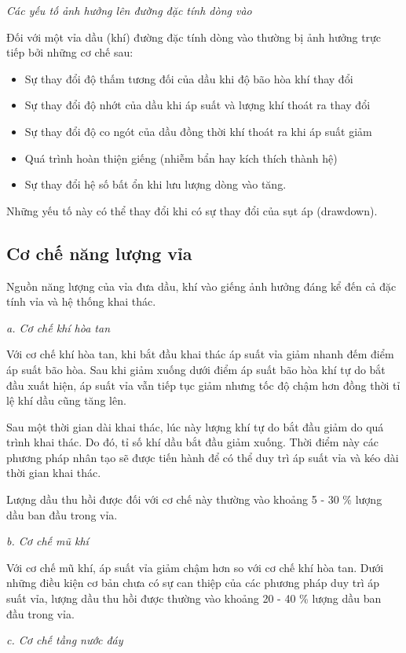 \documentclass[12pt,a4paper]{report}
\begin{document}
\textit{Các yếu tố ảnh hưởng lên đường đặc tính dòng vào}

Đối với một vỉa dầu (khí) đường đặc tính dòng vào thường bị ảnh hưởng trực tiếp bởi những cơ chế sau:
	\begin{itemize}
		\item Sự thay đổi độ thấm tương đối của dầu khi độ bão hòa khí thay đổi
		\item Sự thay đổi độ nhớt của dầu khi áp suất và lượng khí thoát ra thay đổi
		\item Sự thay đổi độ co ngót của dầu đồng thời khí thoát ra khi áp suất giảm
		\item Quá trình hoàn thiện giếng (nhiễm bẩn hay kích thích thành hệ)
		\item Sự thay đổi hệ số bất ổn khi lưu lượng dòng vào tăng.
	\end{itemize}
Những yếu tố này có thể thay đổi khi có sự thay đổi của sụt áp (drawdown).\\

\subsection{Cơ chế năng lượng vỉa}
Nguồn năng lượng của vỉa đưa dầu, khí vào giếng ảnh hưởng đáng kể đến cả đặc tính vỉa và hệ thống khai thác.

\textit{a. Cơ chế khí hòa tan}

Với cơ chế khí hòa tan, khi bắt đầu khai thác áp suất vỉa giảm nhanh đếm điểm áp suất bão hòa. Sau khi giảm xuống dưới điểm áp suất bão hòa khí tự do bắt đầu xuất hiện, áp suất vỉa vẫn tiếp tục giảm nhưng tốc độ chậm hơn đồng thời tỉ lệ khí dầu cũng tăng lên.

Sau một thời gian dài khai thác, lúc này lượng khí tự do bắt đầu giảm do quá trình khai thác. Do đó, tỉ số khí dầu bắt đầu giảm xuống. Thời điểm này các phương pháp nhân tạo sẽ được tiến hành để có thể duy trì áp suất vỉa và kéo dài thời gian khai thác.

Lượng dầu thu hồi được đối với cơ chế này thường vào khoảng 5 - 30 \% lượng dầu ban đầu trong vỉa.

\textit{b. Cơ chế mũ khí}

Với cơ chế mũ khí, áp suất vỉa giảm chậm hơn so với cơ chế khí hòa tan. Dưới những điều kiện cơ bản chưa có sự can thiệp của các phương pháp duy trì áp suất vỉa, lượng dầu thu hồi được thường vào khoảng 20 - 40 \% lượng dầu ban đầu trong vỉa.

\textit{c. Cơ chế tầng nước đáy}
\end{document}

